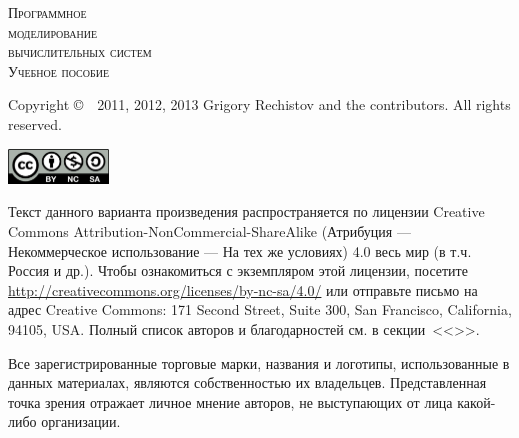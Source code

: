 
\newlength{\centeroffset}
\setlength{\centeroffset}{-0.5\oddsidemargin}
\addtolength{\centeroffset}{0.5\evensidemargin}

\thispagestyle{empty}

\begin{center}
    {\Huge\textsc{Программное \\ моделирование \\ \vspace{3pt} вычислительных систем}}
    \vspace{1cm}\\
    {\Large\textsc{Учебное пособие}}
\end{center}

\noindent\hspace*{\centeroffset}
\pagebreak

\thispagestyle{empty}
\begin{small} 
Copyright \copyright~~2011, 2012, 2013 Grigory Rechistov and the contributors.  All rights reserved.
\begin{center}
    \includegraphics[width=0.2\textwidth]{../cc-by-nc-sa.png}
\end{center}

Текст данного варианта произведения распространяется по лицензии Creative Commons At\-tri\-bu\-tion-Non\-Com\-mer\-cial-Share\-Alike (Атрибуция — Некоммерческое использование — На тех же условиях) 4.0 весь мир (в т.ч. Россия и др.). Чтобы ознакомиться с экземпляром этой лицензии, посетите \url{http://creativecommons.org/licenses/by-nc-sa/4.0/} или отправьте письмо на адрес Creative Commons: 171 Second Street, Suite 300, San Francisco, California, 94105, USA. 
Полный список авторов и благодарностей см. в секции~<<>>.

Все зарегистрированные торговые марки, названия и логотипы, использованные в данных материалах, являются собственностью их владельцев. Представленная точка зрения отражает личное мнение авторов, не выступающих от лица какой-либо организации.
\end{small}

